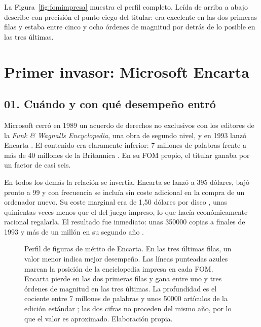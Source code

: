 \documentclass[11pt,letterpaper]{article}
\newcommand{\fomgrid}[1]{%
  \foreach \e in {-3,-2,...,9} {%
    \pgfmathsetmacro{\xg}{0.92*(\e+3)}%
    \draw[gray!16] (\xg,-0.45) -- (\xg,#1);%
  }%
  \foreach \e/\lab in {-3/{$10^{-3}$}, -1/{$10^{-1}$}, 1/{$10^{1}$},
                       3/{$10^{3}$}, 5/{$10^{5}$}, 7/{$10^{7}$}, 9/{$10^{9}$}} {%
    \pgfmathsetmacro{\xg}{0.92*(\e+3)}%
    \draw[gray!45] (\xg,-0.45) -- (\xg,#1);%
    \node[below, font=\tiny, gray!55!black] at (\xg,-0.45) {\lab};%
  }%
}
\newcommand{\fombar}[5]{%
  \node[left, text width=3.5cm, align=right, font=\scriptsize] at (-0.12,#1) {#4};%
  \fill[#3] (0,#1-0.17) rectangle (#2,#1+0.17);%
  \node[right, font=\scriptsize] at (#2+0.10,#1) {#5};%
}
\newcommand{\rCob}{Cobertura\\\tiny (artículos)}
\newcommand{\rPro}{Profundidad\\\tiny (palabras por artículo)}
\newcommand{\rLat}{Latencia de actualización\\\tiny (segundos)}
\newcommand{\rAcc}{Latencia de acceso\\\tiny (segundos)}
\newcommand{\rCos}[1]{Coste marginal\\por #1\\\tiny (dólares)}
\newcommand{\notafom}{En las tres últimas filas, un valor menor indica mejor
  desempeño.}
\begin{document}
La Figura~\ref{fig:fomimpresa} muestra el perfil completo. Leída de arriba a
abajo describe con precisión el punto ciego del titular: era excelente en las dos
primeras filas y estaba entre cinco y ocho órdenes de magnitud por detrás de lo
posible en las tres últimas.

\section{Primer invasor: Microsoft Encarta}

\subsection*{01. Cuándo y con qué desempeño entró}

Microsoft cerró en 1989 un acuerdo de derechos no exclusivos con los editores de
la \emph{Funk \& Wagnalls Encyclopedia}, una obra de segundo nivel, y en 1993
lanzó Encarta \parencite{smith2017}. El contenido era claramente inferior:
7 millones de palabras frente a más de 40 millones de la Britannica
\parencite{evans1997}. En su FOM propio, el titular ganaba por un factor de casi
seis.

En todos los demás la relación se invertía. Encarta se lanzó a 395 dólares,
bajó pronto a 99 y con frecuencia se incluía sin coste adicional en la compra de
un ordenador nuevo. Su coste marginal era de 1,50 dólares por disco
\parencite{evans1997}, unas quinientas veces menos que el del juego impreso, lo
que hacía económicamente racional regalarla. El resultado fue inmediato: unas
\num{350000} copias a finales de 1993 y más de un millón en su segundo año
\parencite{encartawiki}.

\begin{figure}[ht]
  \centering
  \caption{Perfil de figuras de mérito de Encarta. \notafom{} Las líneas
  punteadas azules marcan la posición de la enciclopedia impresa en cada FOM.
  Encarta pierde en las dos primeras filas y gana entre uno y tres órdenes de
  magnitud en las tres últimas. La profundidad es el cociente entre 7 millones
  de palabras
  \parencite{evans1997} y unos \num{50000} artículos de la edición estándar
  \parencite{encartawiki}; las
  dos cifras no proceden del mismo año, por lo que el valor es aproximado.
  Elaboración propia.}
  \label{fig:fomencarta}
\end{figure}
\end{document}
